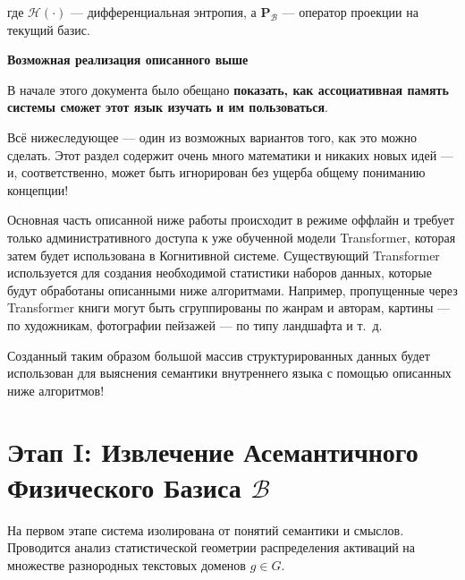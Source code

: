 \documentclass[11pt,a4paper]{article}
\begin{document}
где $\mathcal{H}(\cdot)$ — дифференциальная энтропия, а $\mathbf{P}_{\mathcal{B}}$ — оператор проекции на текущий базис.

\clearpage
{}
{}
\begin{center}
{\Huge\bfseries Возможная реализация описанного выше\par}
\end{center}
\vspace{0.8cm}

В начале этого документа было обещано \textbf{показать, как ассоциативная память системы сможет этот язык изучать и им пользоваться}.

Всё нижеследующее — один из возможных вариантов того, как это можно сделать. Этот раздел содержит очень много математики и никаких новых идей — и, соответственно, может быть игнорирован без ущерба общему пониманию концепции!

Основная часть описанной ниже работы происходит в режиме оффлайн и требует только административного доступа к уже обученной модели Transformer, которая затем будет использована в Когнитивной системе. Существующий Transformer используется для создания необходимой статистики наборов данных, которые будут обработаны описанными ниже алгоритмами. Например, пропущенные через Transformer книги могут быть сгруппированы по жанрам и авторам, картины — по художникам, фотографии пейзажей — по типу ландшафта и т.~д.

Созданный таким образом большой массив структурированных данных будет использован для выяснения семантики внутреннего языка с помощью описанных ниже алгоритмов!

\footnotesize
\section{Этап I: Извлечение Асемантичного Физического Базиса $\mathcal{B}$}

На первом этапе система изолирована от понятий семантики и смыслов. Проводится анализ статистической геометрии распределения активаций на множестве разнородных текстовых доменов $g \in G$.

\begin{center}
\end{center}
\end{document}
